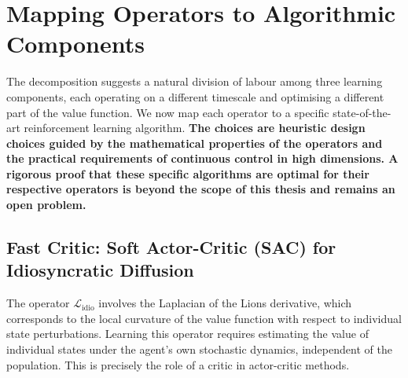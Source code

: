 \begin{table}[ht]
\centering
\small
\caption{SPDE Operator Decomposition and Timescales}
\label{tab:operator-decomposition}
\end{table}


\section{Mapping Operators to Algorithmic Components}
\label{sec:hrl-mapping}

The decomposition suggests a natural division of labour among three learning
components, each operating on a different timescale and optimising a different part
of the value function. We now map each operator to a specific state-of-the-art
reinforcement learning algorithm. \textbf{The choices are heuristic design choices
guided by the mathematical properties of the operators and the practical
requirements of continuous control in high dimensions. A rigorous proof that these
specific algorithms are optimal for their respective operators is beyond the scope
of this thesis and remains an open problem.}

\subsection{Fast Critic: Soft Actor-Critic (SAC) for Idiosyncratic Diffusion}

The operator $\mathcal{L}_{\mathrm{idio}}$ involves the Laplacian of the Lions
derivative, which corresponds to the local curvature of the value function with
respect to individual state perturbations. Learning this operator requires
estimating the value of individual states under the agent's own stochastic dynamics,
independent of the population. This is precisely the role of a critic in
actor-critic methods.

